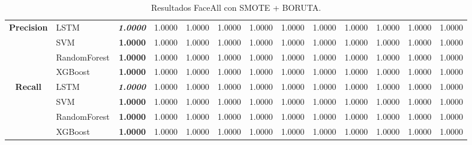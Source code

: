 \begin{table}[H]
\begin{adjustbox}{max width=14cm}
\begin{tabular}{|c|l|r|r|r|r|r|r|r|r|r|r|r|}
			\textbf{Precision} & LSTM &  \textit{\textbf{1.0000}} &  1.0000 &  1.0000 &  1.0000 &  1.0000 &  1.0000 &  1.0000 &  1.0000 &  1.0000 &  1.0000 &  1.0000 \\
			& SVM & \textbf{1.0000} &  1.0000 &  1.0000 &  1.0000 &  1.0000 &  1.0000 &  1.0000 &  1.0000 &  1.0000 &  1.0000 &  1.0000 \\
			& RandomForest &  \textbf{1.0000} &  1.0000 &  1.0000 &  1.0000 &  1.0000 &  1.0000 &  1.0000 &  1.0000 &  1.0000 &  1.0000 &  1.0000 \\
			& XGBoost &  \textbf{1.0000} &  1.0000 &  1.0000 &  1.0000 &  1.0000 &  1.0000 &  1.0000 &  1.0000 &  1.0000 &  1.0000 &  1.0000 \\
			\hline
			\textbf{Recall} & LSTM &  \textit{\textbf{1.0000}} &  1.0000 &  1.0000 &  1.0000 &  1.0000 &  1.0000 &  1.0000 &  1.0000 &  1.0000 &  1.0000 &  1.0000 \\
			& SVM &  \textbf{1.0000} &  1.0000 &  1.0000 &  1.0000 &  1.0000 &  1.0000 &  1.0000 &  1.0000 &  1.0000 &  1.0000 &  1.0000 \\
			& RandomForest &  \textbf{1.0000} &  1.0000 &  1.0000 &  1.0000 &  1.0000 &  1.0000 &  1.0000 &  1.0000 &  1.0000 &  1.0000 &  1.0000 \\
			& XGBoost &  \textbf{1.0000} &  1.0000 &  1.0000 &  1.0000 &  1.0000 &  1.0000 &  1.0000 &  1.0000 &  1.0000 &  1.0000 &  1.0000 \\
			\hline
			
		\end{tabular}
	\end{adjustbox}
	\caption{Resultados FaceAll con SMOTE + BORUTA.}
	\label{tab:faceAllSMOTEBORUTA}
\end{table}

